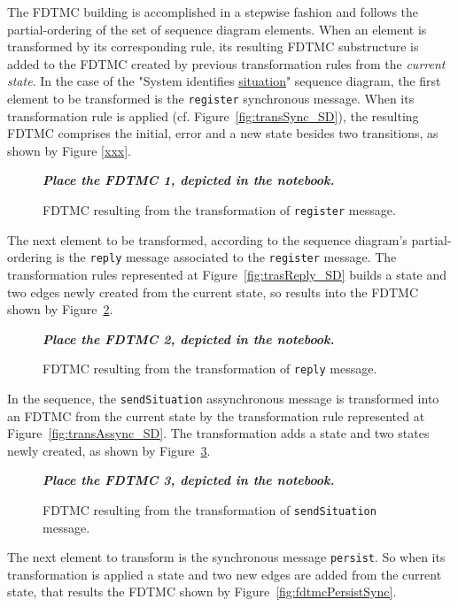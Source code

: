 The FDTMC building is accomplished in a stepwise fashion and follows the
partial-ordering of the set of sequence diagram elements. When an element is
transformed by its corresponding rule, its resulting FDTMC substructure is added
to the FDTMC created by previous transformation rules from the \textit{current state}. In the case of the "System
identifies \underline{situation}" sequence
diagram, the first element to be transformed is the \texttt{register}
synchronous message. When its transformation rule is applied (cf.
Figure~\ref{fig:transSync_SD}), the resulting FDTMC comprises the initial, error
and a new state besides two transitions, as shown by Figure \ref{xxx}.

\begin{figure}
\textbf{\textit{Place the FDTMC 1, depicted in the notebook.}}
\caption{FDTMC resulting from the transformation of \texttt{register} message.}
\label{fig:fdtmcRegister}
\end{figure}

The next element to be transformed, according to the sequence diagram's
partial-ordering is the \texttt{reply} message associated to the
\texttt{register} message. The transformation rules represented at
Figure~\ref{fig:trasReply_SD} builds a state and two edges newly created from
the current state, so results into the FDTMC shown by
Figure~\ref{fig:fdtmcRegisterReply}.

\begin{figure}
\textbf{\textit{Place the FDTMC 2, depicted in the notebook.}}
\caption{FDTMC resulting from the transformation of \texttt{reply} message.}
\label{fig:fdtmcRegisterReply}
\end{figure}

In the sequence, the \texttt{sendSituation} assynchronous message is transformed
into an FDTMC from the current state by the transformation rule represented at
Figure~\ref{fig:transAssync_SD}. The transformation adds a state and two states
newly created, as shown by Figure~\ref{fig:fdtmcSendSituation}.

\begin{figure} 
	\textbf{\textit{Place the FDTMC 3, depicted in the notebook.}}
	\caption{FDTMC resulting from the transformation of
	\texttt{sendSituation} message.} 
	\label{fig:fdtmcSendSituation}
\end{figure}

The next element to transform is the synchronous message \texttt{persist}. So
when its transformation is applied a state and two new edges are added from the
current state, that results the FDTMC shown by Figure~\ref{fig:fdtmcPersistSync}.

